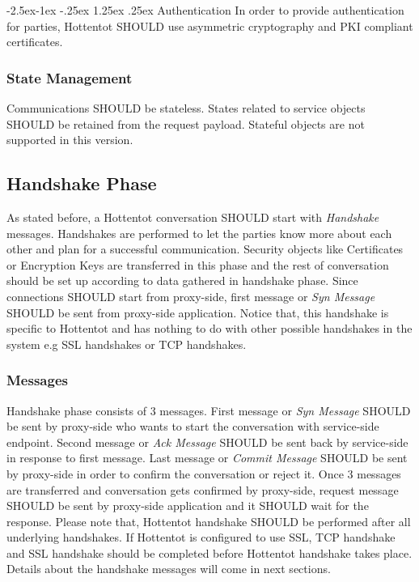 \documentclass[10pt,a4paper]{article}
\makeatletter
\renewcommand\paragraph{\@startsection{paragraph}{4}{\z@}%
            {-2.5ex\@plus -1ex \@minus -.25ex}%
            {1.25ex \@plus .25ex}%
            {\normalfont\normalsize\bfseries}}
\makeatother
\begin{document}
\paragraph{Authentication}
In order to provide authentication for parties, Hottentot SHOULD use asymmetric cryptography and PKI compliant certificates.

\subsubsection{State Management}
Communications SHOULD be stateless. States related to service objects SHOULD be retained from the request payload. Stateful objects are not supported in this version.


\subsection{Handshake Phase}
As stated before, a Hottentot conversation SHOULD start with \textit{Handshake} messages. Handshakes are performed to let the parties know more about each other and plan for a successful communication. Security objects like Certificates or Encryption Keys are transferred in this phase and the rest of conversation should be set up according to data gathered in handshake phase. Since connections SHOULD start from proxy-side, first message or \textit{Syn Message} SHOULD be sent from proxy-side application. Notice that, this handshake is specific to Hottentot and has nothing to do with other possible handshakes in the system e.g SSL handshakes or TCP handshakes.

\subsubsection{Messages}
Handshake phase consists of 3 messages. First message or \textit{Syn Message} SHOULD be sent by proxy-side who wants to start the conversation with service-side endpoint. Second message or \textit{Ack Message} SHOULD be sent back by service-side in response to first message. Last message or \textit{Commit Message} SHOULD be sent by proxy-side in order to confirm the conversation or reject it. Once 3 messages are transferred and conversation gets confirmed by proxy-side, request message SHOULD be sent by proxy-side application and it SHOULD wait for the response. Please note that, Hottentot handshake SHOULD be performed after all underlying handshakes. If Hottentot is configured to use SSL, TCP handshake and SSL handshake should be completed before Hottentot handshake takes place. Details about the handshake messages will come in next sections.
\end{document}
